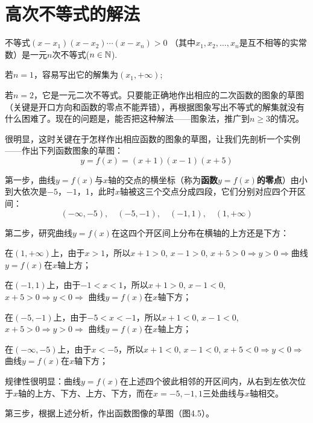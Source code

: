 \section{高次不等式的解法}

不等式$(x-x_1)(x-x_2)\cdots(x-x_n)>0$
（其中$x_1,x_2,\ldots,x_n$是互不相等的实常数）是一元$n$次不等式($n\in\mathbb{N}$). 

若$n=1$，容易写出它的解集为$(x_1,+\infty)$;

若$n=2$，它是一元二次不等式。只要能正确地作出相应的二次函数的图象的草图（关键是开口方向和函数的零点不能弄错），再根据图象写出不等式的解集就没有什么困难了。现在的问题是，能否把这种解法——图象法，推广到$n\ge 3$的情况。

很明显，这时关键在于怎样作出相应函数的图象的草图，让我们先剖析一个实例——作出下列函数图象的草图：
\[y=f(x)=(x+1)(x-1)(x+5)\]

第一步，曲线$y=f(x)$与$x$轴的交点的横坐标（称为\textbf{函数$y=f(x)$的零点}）由小到大依次是$-5$，$-1$，1，此时$x$轴被这三个交点分成四段，它们分别对应四个开区间：
\[(-\infty,-5),\quad (-5,-1),\quad (-1,1), \quad (1,+\infty)\]

第二步，研究曲线$y=f(x)$在这四个开区间上分布在横轴的上方还是下方：

在$(1,+\infty)$上，由于$x>1$，所以$x+1>0$, $x-1>0$, $x+5>0\Longrightarrow y>0 \Longrightarrow $曲线$y=f(x)$在$x$轴上方；

在$(-1,1)$上，由于$-1<x<1$，所以$x+1>0$, 
$x-1<0$, $x+5>0\Longrightarrow y<0\Longrightarrow $ 曲线$y=f(x)$在$x$轴下方；

在$(-5,-1)$上，由于$-5<x<-1$，所以$x+1<0$, 
$x-1<0$, $x+5>0\Longrightarrow y>0\Longrightarrow$ 曲线$y=f(x)$在$x$轴上方；

在$(-\infty,-5)$上，由于$x<-5$，所以$x+1<0$, $x-1<0$, $x+5<0\Longrightarrow y<0\Longrightarrow$曲线$y=f(x)$在$x$轴下方；

规律性很明显：曲线$y=f(x)$在上述四个彼此相邻的开区间内，从右到左依次位于$x$轴的上方、下方、上方、下方，而在$x=-5,-1,1$三处曲线与$x$轴相交。

第三步，根据上述分析，作出函数图像的草图（图4.5）。

\begin{figure}[htp]
    \centering
{}
    \caption{}
\end{figure}


